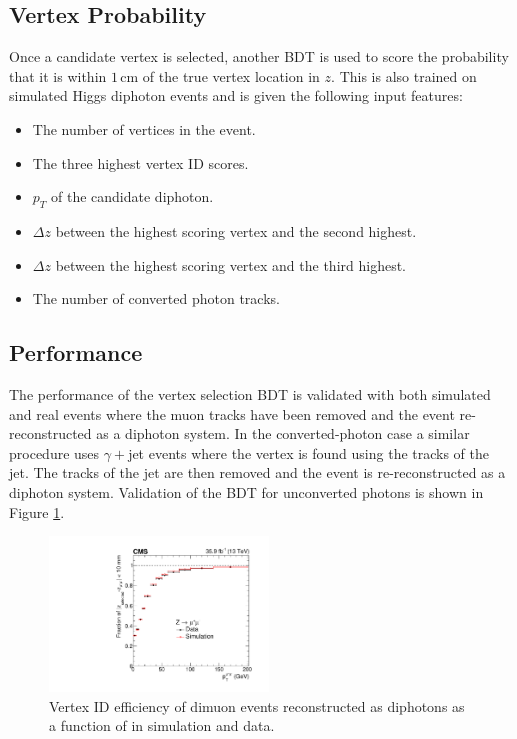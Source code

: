 \subsection{Vertex Probability}
Once a candidate vertex is selected, another BDT is used to score the probability that it is within $1$\,cm of the true vertex location in $z$.   
This is also trained on simulated Higgs diphoton events and is given the following input features:
\begin{itemize}[noitemsep]
    \item The number of vertices in the event.
    \item The three highest vertex ID scores.
    \item $p_{T}$ of the candidate diphoton.
    \item $\Delta{z}$ between the highest scoring vertex and the second highest.
    \item $\Delta{z}$ between the highest scoring vertex and the third highest.
    \item The number of converted photon tracks.
\end{itemize}


\subsection{Performance}
The performance of the vertex selection BDT is validated with both simulated and real \Zmumu events where the muon tracks have been removed and the event re-reconstructed as a diphoton system. 
In the converted-photon case a similar procedure uses $\gamma + $jet events where the vertex is found using the tracks of the jet. 
The tracks of the jet are then removed and the event is re-reconstructed as a diphoton system. Validation of the BDT for unconverted photons is shown in Figure \ref{fig:object_reco:vertex_id_valid}. 
\begin{figure}[h!]
    \centering
    \includegraphics[width=0.52\textwidth]{figures/object_reco/CMS-HIG-16-040_Figure_003.pdf}
    \caption{Vertex ID efficiency of dimuon events reconstructed as diphotons as a function of \pt in simulation and data.}
        \label{fig:object_reco:vertex_id_valid}
\end{figure}

